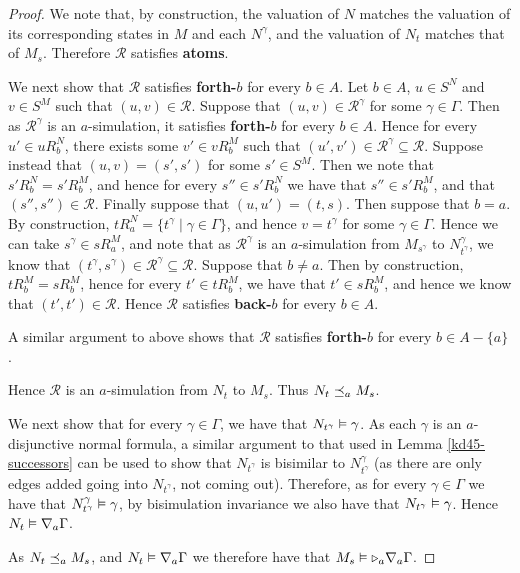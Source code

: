\begin{proof}
We note that, by construction, the valuation of $N$ matches the valuation of its
corresponding states in $M$ and each $N^\gamma$, and the valuation of $N_t$
matches that of $M_s$. Therefore $\mathcal{R}$ satisfies {\bf atoms}.

We next show that $\mathcal{R}$ satisfies {\bf forth-$b$} for every $b \in A$.
Let $b \in A$, $u \in S^N$ and $v \in S^M$ such that $(u, v) \in
\mathcal{R}$. Suppose that $(u, v) \in \mathcal{R}^\gamma$ for some $\gamma \in
\Gamma$. Then as $\mathcal{R}^\gamma$ is an $a$-simulation, it satisfies {\bf
forth-$b$} for every $b \in A$. Hence for every $u' \in uR^N_b$, there exists
some $v' \in vR^M_b$ such that $(u', v') \in \mathcal{R}^\gamma \subseteq
\mathcal{R}$. Suppose instead that $(u, v) = (s', s')$ for some $s' \in S^M$.
Then we note that $s'R^N_b = s'R^M_b$, and hence for every $s'' \in s'R^N_b$ we
have that $s'' \in s'R^M_b$, and that $(s'', s'') \in \mathcal{R}$. Finally suppose
that $(u, u') = (t, s)$. Then suppose that $b = a$. By construction, $tR^N_a =
\{t^\gamma \mid \gamma \in \Gamma\}$, and hence $v = t^\gamma$ for some $\gamma
\in \Gamma$. Hence we can take $s^\gamma \in sR^M_a$, and note that as
$\mathcal{R}^\gamma$ is an $a$-simulation from $M_{s^\gamma}$ to
$N^\gamma_{t^\gamma}$, we know that $(t^\gamma, s^\gamma) \in \mathcal{R}^\gamma
\subseteq \mathcal{R}$. Suppose that $b \neq a$. Then by construction, $tR^M_b =
sR^M_b$, hence for every $t' \in tR^M_b$, we have that $t' \in sR^M_b$, and
hence we know that $(t', t') \in \mathcal{R}$. Hence $\mathcal{R}$ satisfies
{\bf back-$b$} for every $b \in A$.

A similar argument to above shows that $\mathcal{R}$ satisfies {\bf forth-$b$}
for every $b \in A - \{a\}$.

Hence $\mathcal{R}$ is an $a$-simulation from $N_t$ to $M_s$. Thus $N_t
\preceq_a M_s$. 

We next show that for every $\gamma \in \Gamma$, we have that $N_{t^\gamma}
\vDash \gamma$. As each $\gamma$ is an $a$-disjunctive normal formula, a
similar argument to that used in Lemma \ref{kd45-successors} can be used to show
that $N_{t^\gamma}$ is bisimilar to $N^\gamma_{t^\gamma}$ (as there are only
edges added going into $N_{t^\gamma}$, not coming out). Therefore, as for every
$\gamma \in \Gamma$ we have that $N^\gamma_{t^\gamma} \vDash \gamma$, by
bisimulation invariance we also have that $N_{t^\gamma} \vDash \gamma$. Hence
$N_t \vDash \nabla_a \Gamma$.

As $N_t \preceq_a M_s$, and $N_t \vDash \nabla_a \Gamma$ we therefore
have that $M_s \vDash {\ensuremath{\mathopen{\triangleright}}}_a \nabla_a \Gamma$.


\end{proof}
